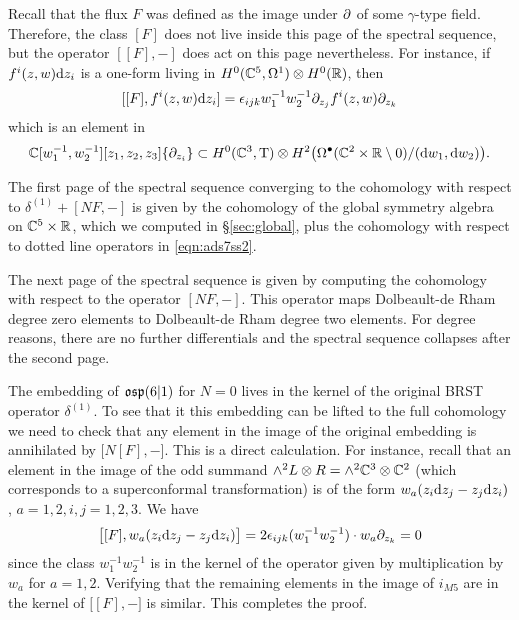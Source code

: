 Recall that the flux $F$ was defined as the image under $\partial$ of some $\gamma$-type field. 
Therefore, the class $[F]$ does not live inside this page of the spectral sequence, but the operator $[[F], -]$ does act on this page nevertheless. 
For instance, if $f^i(z,w) {\rm d} z_i$ is a one-form living in $H^0(\mathbb C^5, \Omega^1) \otimes H^0(\mathbb R)$, then
\[
[ [F] , f^i (z,w) {\rm d} z_i ] = \epsilon_{ijk} w_1^{-1} w_2^{-1} \partial_{z_j} f^i(z,w) \partial_{z_k} 
\]
which is an element in 
\[
\mathbb C[w_1^{-1}, w_2^{-1}][z_1,z_2,z_3] \{\partial_{z_i}\} \subset H^0(\mathbb C^3, {\rm T}) \otimes H^2 \big(\Omega^\bullet(\mathbb C^2 \times \mathbb R \setminus 0) / ({\rm d} w_1 , {\rm d} w_2) \big) .
\]

The first page of the spectral sequence converging to the cohomology with respect to $\delta^{(1)} + [N F, -]$ is given by the cohomology of the global symmetry algebra on $\mathbb C^5 \times \mathbb R$, which we computed in \S \ref{sec:global}, plus the cohomology with respect to dotted line operators in \eqref{eqn:ads7ss2}. 

The next page of the spectral sequence is given by computing the cohomology with respect to the operator $[N F,-]$. 
This operator maps Dolbeault-de Rham degree zero elements to Dolbeault-de Rham degree two elements. 
For degree reasons, there are no further differentials and the spectral sequence collapses after the second page. 

The embedding of $\mathfrak{osp}(6|1)$ for $N=0$ lives in the kernel of the original BRST operator $\delta^{(1)}$. 
To see that it this embedding can be lifted to the full cohomology we need to check that any element in the image of the original embedding is annihilated by $\big[ N [F] , - \big]$. 
This is a direct calculation. 
For instance, recall that an element in the image of the odd summand $\wedge^2 L \otimes R = \wedge^2 \mathbb C^3 \otimes \mathbb C^2$ (which corresponds to a superconformal transformation) is of the form $w_a (z_i {\rm d} z_j - z_j {\rm d} z_i)$, $a=1,2, i,j=1,2,3$. 
We have
\[
\big[[F] , w_a (z_i {\rm d} z_j - z_j {\rm d} z_i)\big] = 2 \epsilon_{ijk} (w_1^{-1} w_2^{-1}) \cdot w_a \partial_{z_k} = 0
\]
since the class $w_1^{-1} w_2^{-1}$ is in the kernel of the operator given by multiplication by $w_a$ for $a=1,2$.
Verifying that the remaining elements in the image of $i_{M5}$ are in the kernel of $\big[ [F], -\big]$ is similar.
This completes the proof.


